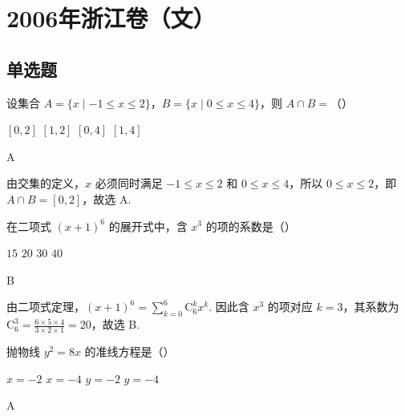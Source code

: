 
\chapter{2006年浙江卷（文）}
\section{单选题}
\begin{problem}
设集合 \(A = \{x \mid -1 \leqslant x \leqslant 2\}\)，\(B = \{x \mid 0 \leqslant x \leqslant 4\}\)，则 \(A \cap B =\)（\quad）

\choices
    {\([0,2]\)}
    {\([1,2]\)}
    {\([0,4]\)}
    {\([1,4]\)}
\end{problem}

\begin{answer}
A
\end{answer}

\begin{solution}
由交集的定义，\(x\) 必须同时满足 \(-1\leqslant x\leqslant2\) 和 \(0\leqslant x\leqslant4\)，所以 \(0\leqslant x\leqslant2\)，即 \(A\cap B=[0,2]\)，故选 A.
\end{solution}

\begin{problem}
在二项式 \((x + 1)^6\) 的展开式中，含 \(x^3\) 的项的系数是（\quad）

\choices
    {\(15\)}
    {\(20\)}
    {\(30\)}
    {\(40\)}
\end{problem}

\begin{answer}
B
\end{answer}

\begin{solution}
由二项式定理，\((x+1)^6=\sum_{k=0}^{6}\mathrm C_6^k x^k\). 因此含 \(x^3\) 的项对应 \(k=3\)，其系数为 \(\mathrm C_6^3=\frac{6\times5\times4}{3\times2\times1}=20\)，故选 B.
\end{solution}

\begin{problem}
抛物线 \( y^{2} = 8x \) 的准线方程是（\quad）

\choices
    {\(x = -2\)}
    {\(x = -4\)}
    {\(y = -2\)}
    {\(y = -4\)}
\end{problem}

\begin{answer}
A
\end{answer}

